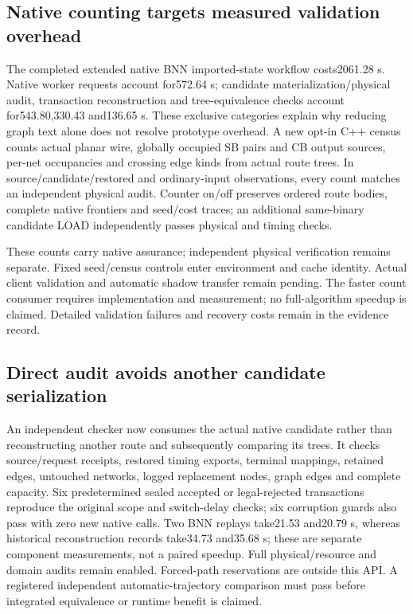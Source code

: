 \documentclass[conference,10pt]{IEEEtran}
\begin{document}
\subsection{Native counting targets measured validation overhead}
The completed extended native BNN imported-state workflow costs2061.28 s. Native worker requests account for572.64 s; candidate materialization/physical audit, transaction reconstruction and tree-equivalence checks account for543.80,330.43 and136.65 s. These exclusive categories explain why reducing graph text alone does not resolve prototype overhead. A new opt-in C++ census counts actual planar wire, globally occupied SB pairs and CB output sources, per-net occupancies and crossing edge kinds from actual route trees. In source/candidate/restored and ordinary-input observations, every count matches an independent physical audit. Counter on/off preserves ordered route bodies, complete native frontiers and seed/cost traces; an additional same-binary candidate LOAD independently passes physical and timing checks.

These counts carry native assurance; independent physical verification remains separate. Fixed seed/census controls enter environment and cache identity. Actual client validation and automatic shadow transfer remain pending. The faster count consumer requires implementation and measurement; no full-algorithm speedup is claimed. Detailed validation failures and recovery costs remain in the evidence record.

\subsection{Direct audit avoids another candidate serialization}
An independent checker now consumes the actual native candidate rather than reconstructing another route and subsequently comparing its trees. It checks source/request receipts, restored timing exports, terminal mappings, retained edges, untouched networks, logged replacement nodes, graph edges and complete capacity. Six predetermined sealed accepted or legal-rejected transactions reproduce the original scope and switch-delay checks; six corruption guards also pass with zero new native calls. Two BNN replays take21.53 and20.79 s, whereas historical reconstruction records take34.73 and35.68 s; these are separate component measurements, not a paired speedup. Full physical/resource and domain audits remain enabled. Forced-path reservations are outside this API. A registered independent automatic-trajectory comparison must pass before integrated equivalence or runtime benefit is claimed.
\end{document}
